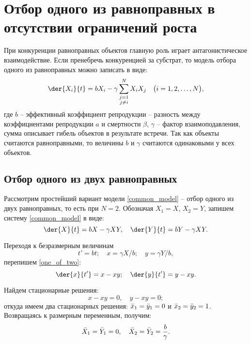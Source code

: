 \section{Отбор одного из равноправных в отсутствии ограничений роста}

При конкуренции равноправных объектов главную роль играет антагонистическое
взаимодействие. Если пренебречь конкуренцией за субстрат, то модель отбора
одного из равноправных можно записать в виде:
\begin{equation}
    \der{X_i}{t} = bX_i - \gamma\sum_{\substack{j = 1 \\ j \ne i}}^N X_i X_j \quad
    \bigr(i = 1, 2, \ldots, N\bigl),
    \label{common_model}
\end{equation}
где \( b \) -- эффективный коэффициент репродукции -- разность между
коэффициентами репродукции \( a \) и смертности \( \beta \), \( \gamma \) --
фактор взаимоподавления, сумма описывает гибель объектов в результате встречи.
Так как объекты считаются равноправными, то величины \( b \) и \( \gamma \)
считаются одинаковыми у всех объектов.

\vspace*{1em} %
\subsection{Отбор одного из двух равноправных}

Рассмотрим простейший вариант модели \eqref{common_model} -- отбор одного из
двух равноправных, то есть при \( N = 2 \). Обозначая \( X_1 = X \),
\( X_2 = Y \), запишем систему \eqref{common_model} в виде:
\begin{equation}
    \der{X}{t} = bX - \gamma XY, \quad \der{Y}{t} = bY - \gamma XY.
    \label{one_of_two}
\end{equation}

Переходя к безразмерным величинам
\[
    t' = bt; \quad x = \gamma X/b; \quad y = \gamma Y/b,
\]
перепишем \eqref{one_of_two}:
\begin{equation}
    \der{x}{t'} = x - xy; \quad \der{y}{t'} = y - xy.
    \label{one_of_two_ml}
\end{equation}

Найдем стационарные решения:
\[
    x - xy = 0, \quad y - xy = 0;
\]
откуда имеем два стационарных решения: \( \bar{x}_1 =\bar{y}_1 = 0 \) и
\( \bar{x}_2 = \bar{y}_2 = 1 \). Возвращаясь к размерным переменным, получим:
\[
    \bar{X}_1 = \bar{Y}_1 = 0, \quad \bar{X}_2 = \bar{Y}_2 = \frac{b}{\gamma}.
\]

